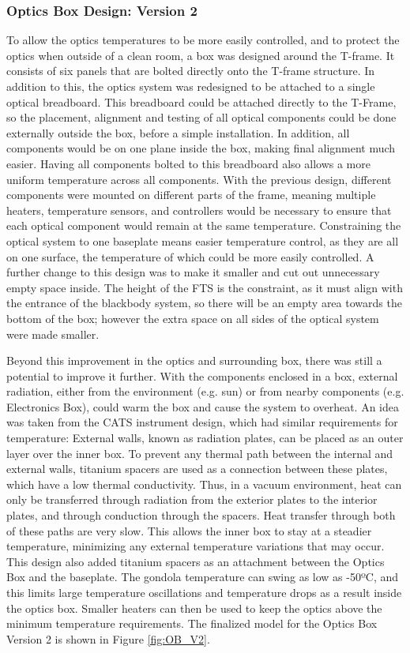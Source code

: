 \subsubsection{Optics Box Design: Version 2}
To allow the optics temperatures to be more easily controlled, and to protect the optics when outside of a clean room, a box was designed around the T-frame. It consists of six panels that are bolted directly onto the T-frame structure. In addition to this, the optics system was redesigned to be attached to a single optical breadboard. This breadboard could be attached directly to the T-Frame, so the placement, alignment and testing of all optical components could be done externally outside the box, before a simple installation. In addition, all components would be on one plane inside the box, making final alignment much easier. Having all components bolted to this breadboard also allows a more uniform temperature across all components. With the previous design, different components were mounted on different parts of the frame, meaning multiple heaters, temperature sensors, and controllers would be necessary to ensure that each optical component would remain at the same temperature. Constraining the optical system to one baseplate means easier temperature control, as they are all on one surface, the temperature of which could be more easily controlled. A further change to this design was to make it smaller and cut out unnecessary empty space inside. The height of the FTS is the constraint, as it must align with the entrance of the blackbody system, so there will be an empty area towards the bottom of the box; however the extra space on all sides of the optical system were made smaller. 

Beyond this improvement in the optics and surrounding box, there was still a potential to improve it further.  With the components enclosed in a box, external radiation, either from the environment (e.g. sun) or from nearby components (e.g. Electronics Box), could warm the box and cause the system to overheat. An idea was taken from the CATS instrument design, which had similar requirements for temperature: External walls, known as radiation plates, can be placed as an outer layer over the inner box. To prevent any thermal path between the internal and external walls, titanium spacers are used as a connection between these plates, which have a low thermal conductivity. Thus, in a vacuum environment, heat can only be transferred through radiation from the exterior plates to the interior plates, and through conduction through the spacers. Heat transfer through both of these paths are very slow. This allows the inner box to stay at a steadier temperature, minimizing any external temperature variations that may occur. This design also added titanium spacers as an attachment between the Optics Box and the baseplate. The gondola temperature can swing as low as -50ºC, and this limits large temperature oscillations and temperature drops as a result inside the optics box. Smaller heaters can then be used to keep the optics above the minimum temperature requirements. The finalized model for the Optics Box Version 2 is shown in Figure \ref{fig:OB_V2}.

